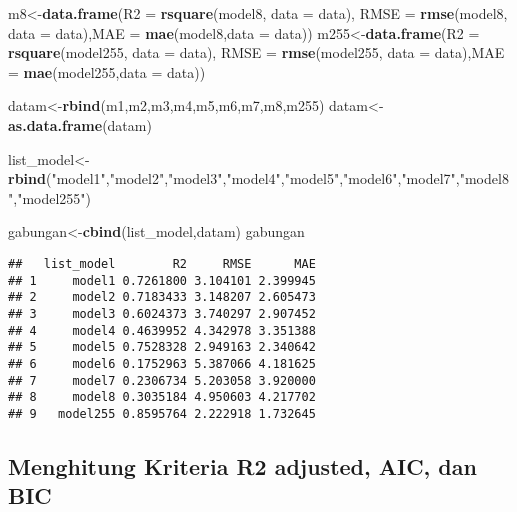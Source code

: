 \documentclass[
]{article}
\newenvironment{Shaded}{\begin{snugshade}}{\end{snugshade}}
\newcommand{\AttributeTok}[1]{\textcolor[rgb]{0.13,0.29,0.53}{#1}}
\newcommand{\FunctionTok}[1]{\textcolor[rgb]{0.13,0.29,0.53}{\textbf{#1}}}
\newcommand{\NormalTok}[1]{#1}
\newcommand{\OtherTok}[1]{\textcolor[rgb]{0.56,0.35,0.01}{#1}}
\newcommand{\StringTok}[1]{\textcolor[rgb]{0.31,0.60,0.02}{#1}}
\begin{document}
\begin{Shaded}
\begin{Highlighting}[]
\NormalTok{m8}\OtherTok{\textless{}{-}}\FunctionTok{data.frame}\NormalTok{(}\AttributeTok{R2 =} \FunctionTok{rsquare}\NormalTok{(model8, }\AttributeTok{data =}\NormalTok{ data), }\AttributeTok{RMSE =}  \FunctionTok{rmse}\NormalTok{(model8, }\AttributeTok{data =}\NormalTok{ data),}\AttributeTok{MAE =} \FunctionTok{mae}\NormalTok{(model8,}\AttributeTok{data =}\NormalTok{ data))}
\NormalTok{m255}\OtherTok{\textless{}{-}}\FunctionTok{data.frame}\NormalTok{(}\AttributeTok{R2 =} \FunctionTok{rsquare}\NormalTok{(model255, }\AttributeTok{data =}\NormalTok{ data), }\AttributeTok{RMSE =}  \FunctionTok{rmse}\NormalTok{(model255, }\AttributeTok{data =}\NormalTok{ data),}\AttributeTok{MAE =} \FunctionTok{mae}\NormalTok{(model255,}\AttributeTok{data =}\NormalTok{ data))}

\NormalTok{datam}\OtherTok{\textless{}{-}}\FunctionTok{rbind}\NormalTok{(m1,m2,m3,m4,m5,m6,m7,m8,m255)}
\NormalTok{datam}\OtherTok{\textless{}{-}}\FunctionTok{as.data.frame}\NormalTok{(datam)}

\NormalTok{list\_model}\OtherTok{\textless{}{-}}\FunctionTok{rbind}\NormalTok{(}\StringTok{"model1"}\NormalTok{,}\StringTok{"model2"}\NormalTok{,}\StringTok{"model3"}\NormalTok{,}\StringTok{"model4"}\NormalTok{,}\StringTok{"model5"}\NormalTok{,}\StringTok{"model6"}\NormalTok{,}\StringTok{"model7"}\NormalTok{,}\StringTok{"model8"}\NormalTok{,}\StringTok{"model255"}\NormalTok{)}

\NormalTok{gabungan}\OtherTok{\textless{}{-}}\FunctionTok{cbind}\NormalTok{(list\_model,datam)}
\NormalTok{gabungan}
\end{Highlighting}
\end{Shaded}

\begin{verbatim}
##   list_model        R2     RMSE      MAE
## 1     model1 0.7261800 3.104101 2.399945
## 2     model2 0.7183433 3.148207 2.605473
## 3     model3 0.6024373 3.740297 2.907452
## 4     model4 0.4639952 4.342978 3.351388
## 5     model5 0.7528328 2.949163 2.340642
## 6     model6 0.1752963 5.387066 4.181625
## 7     model7 0.2306734 5.203058 3.920000
## 8     model8 0.3035184 4.950603 4.217702
## 9   model255 0.8595764 2.222918 1.732645
\end{verbatim}

\subsection{Menghitung Kriteria R2 adjusted, AIC, dan
BIC}\label{menghitung-kriteria-r2-adjusted-aic-dan-bic}
\end{document}
